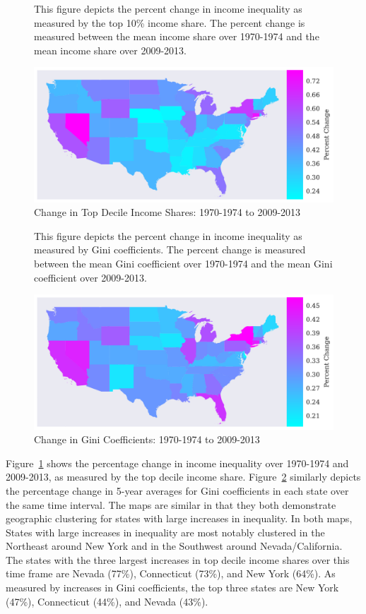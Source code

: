 \documentclass[11pt]{article}
\theoremstyle{definition}
\numberwithin{equation}{section}
\begin{document}
	\begin{figure}[htb!]  	
	\caption{Change in Top Decile Income Shares: 1970-1974 to 2009-2013 \label{fig:P10_map}}	
	This figure depicts the percent change in income inequality as measured by the top 10\% income share. The percent change is measured between the mean income share over 1970-1974 and the mean income share over 2009-2013.
	\begin{center}	
	\includegraphics[width=6.75in]{../figures/maps/Inc10_map.pdf}
	\end{center}
	\end{figure}

	\begin{figure}[htb!]  
	\caption{Change in Gini Coefficients: 1970-1974 to 2009-2013 \label{fig:gini_map}}	
	This figure depicts the percent change in income inequality as measured by Gini coefficients. The percent change is measured between the mean Gini coefficient over 1970-1974 and the mean Gini coefficient over 2009-2013.		
	\begin{center}
	\includegraphics[width=6.75in]{../figures/maps/gini_map.pdf}
	\end{center}
	\end{figure}

Figure~\ref{fig:P10_map} shows the percentage change in income inequality over 1970-1974 and 2009-2013, as measured by the top decile income share. Figure~\ref{fig:gini_map} similarly depicts the percentage change in 5-year averages for Gini coefficients in each state over the same time interval. The maps are similar in that they both demonstrate geographic clustering for states with large increases in inequality. In both maps, States with large increases in inequality are most notably clustered in the Northeast around New York and in the Southwest around Nevada/California. The states with the three largest increases in top decile income shares over this time frame are Nevada (77\%), Connecticut (73\%), and New York (64\%). As measured by increases in Gini coefficients, the top three states are New York (47\%), Connecticut (44\%), and Nevada (43\%).
\end{document}
